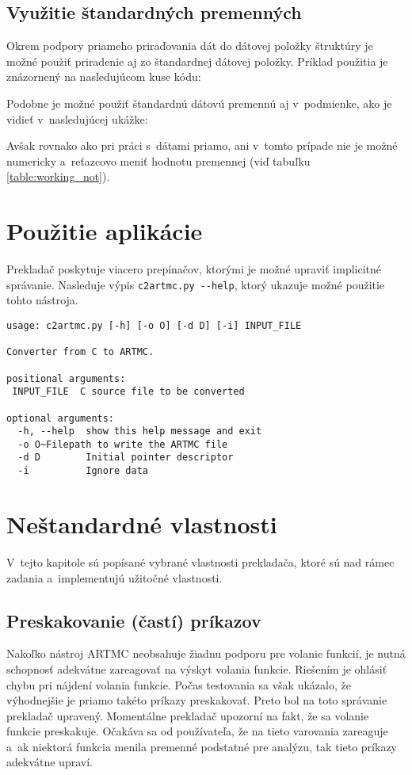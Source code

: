 \subsection{Využitie štandardných premenných}
Okrem podpory priameho priraďovania dát do dátovej položky štruktúry je možné použiť priradenie aj zo štandardnej dátovej položky. Príklad použitia je znázornený na nasledujúcom kuse kódu:


\noindent
Podobne je možné použiť štandardnú dátovú premennú aj v~podmienke, ako je vidieť v~nasledujúcej ukážke:


\noindent
Avšak rovnako ako pri práci s~dátami priamo, ani v~tomto prípade nie je možné numericky a~reťazcovo meniť hodnotu premennej (viď tabuľku \ref{table:working_not}).

\section{Použitie aplikácie}
Prekladač poskytuje viacero prepínačov, ktorými je možné upraviť implicitné správanie.  Nasleduje výpis \texttt{c2artmc.py -{}-help}, ktorý ukazuje možné použitie tohto nástroja.
\begin{verbatim}
usage: c2artmc.py [-h] [-o O] [-d D] [-i] INPUT_FILE

Converter from C to ARTMC.

positional arguments:
 INPUT_FILE  C source file to be converted

optional arguments:
  -h, --help  show this help message and exit
  -o O~Filepath to write the ARTMC file
  -d D        Initial pointer descriptor
  -i          Ignore data
\end{verbatim}

\section{Neštandardné vlastnosti}
\label{sec_features}
V~tejto kapitole sú popísané vybrané vlastnosti prekladača, ktoré sú nad rámec zadania a~implementujú užitočné vlastnosti.
\subsection{Preskakovanie (častí) príkazov}
\label{sec_features_jump}
Nakoľko nástroj ARTMC neobsahuje žiadnu podporu pre volanie funkcií, je nutná schopnosť adekvátne zareagovať na výskyt volania funkcie. Riešením je ohlásiť chybu pri nájdení volania funkcie. Počas testovania sa však ukázalo, že výhodnejšie je priamo takéto príkazy preskakovať. Preto bol na toto správanie prekladač upravený. Momentálne prekladač upozorní na fakt, že sa volanie funkcie preskakuje. Očakáva sa od používateľa, že na tieto varovania zareaguje a~ak niektorá funkcia menila premenné podstatné pre analýzu, tak tieto príkazy adekvátne upraví.

